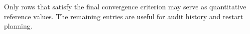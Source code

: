 Only rows that satisfy the final convergence criterion may serve as quantitative reference values. The remaining entries are useful for audit history and restart planning.
